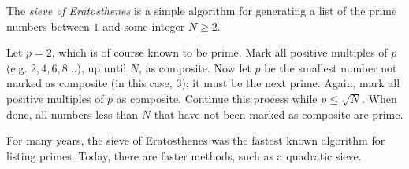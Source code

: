 \documentclass[12pt]{article}
\begin{document}
The \emph{sieve of Eratosthenes} is a simple algorithm for generating a list of the prime numbers between $1$ and some integer $N\geq 2$.

Let $p=2$, which is of course known to be prime.  Mark all positive multiples of $p$ (e.g. $2, 4, 6, 8 \dots$), up until $N$, as composite.  Now let $p$ be the smallest number not marked as composite (in this case, $3$); it must be the next prime.  Again, mark all positive multiples of $p$ as composite.  Continue this process while $p \leq \sqrt{N}$.  When done, all numbers less than $N$ that have not been marked as composite are prime.

For many years, the sieve of Eratosthenes was the fastest known algorithm for listing primes.  Today, there are faster methods, such as a quadratic sieve.
\end{document}
